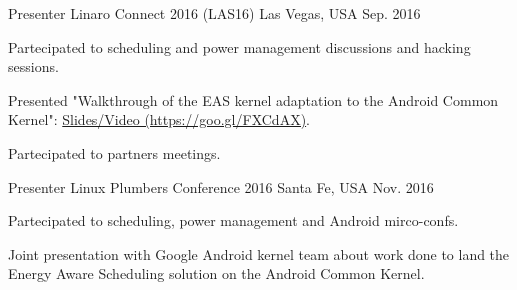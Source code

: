 \begin{cventries}
  \cventry
    {Presenter} %
    {Linaro Connect 2016 (LAS16)} %
    {Las Vegas, USA} %
    {Sep. 2016} %
    {
      \begin{cvitems} %
        \item {Partecipated to scheduling and power management discussions and
		hacking sessions.}
        \item {Presented "Walkthrough of the EAS kernel adaptation to the
		Android Common Kernel":
		\href{http://connect.linaro.org/resource/las16/las16-105/}{Slides/Video (https://goo.gl/FXCdAX)}.}
        \item {Partecipated to partners meetings.}
      \end{cvitems}
    }

  \cventry
    {Presenter} %
    {Linux Plumbers Conference 2016} %
    {Santa Fe, USA} %
    {Nov. 2016} %
    {
      \begin{cvitems} %
        \item {Partecipated to scheduling, power management and Android mirco-confs.}
        \item {Joint presentation with Google Android kernel team about work
		done to land the Energy Aware Scheduling solution on the Android
		Common Kernel.}
      \end{cvitems}
    }

\end{cventries}
